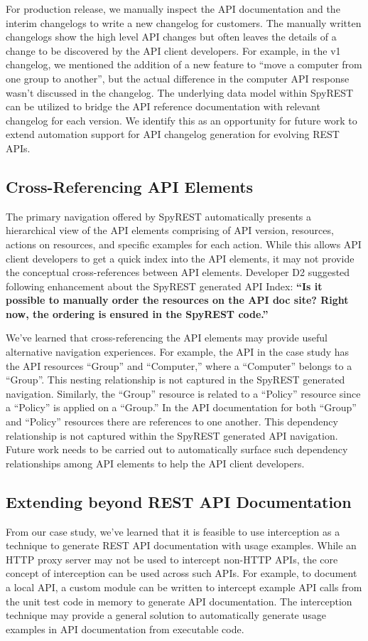 \documentclass[10pt, conference]{IEEEtran}
\begin{document}
For production release, we manually inspect the API documentation and the interim changelogs to write a new changelog for customers. The manually written changelogs show the high level API changes but often leaves the details of a change to be discovered by the API client developers. For example, in the v1 changelog, we mentioned the addition of a new feature to ``move a computer from one group to another'', but the actual difference in the computer API response wasn't discussed in the changelog. The underlying data model within SpyREST can be utilized to bridge the API reference documentation with relevant changelog for each version. We identify this as an opportunity for future work to extend automation support for API changelog generation for evolving REST APIs.

\subsection{Cross-Referencing API Elements}
The primary navigation offered by SpyREST automatically presents a hierarchical view of the API elements comprising of API version, resources, actions on resources, and specific examples for each action. While this allows API client developers to get a quick index into the API elements, it may not provide the conceptual cross-references between API elements. Developer D2 suggested following enhancement about the SpyREST generated API Index: \textbf{``Is it possible to manually order the resources on the API doc site? Right now, the ordering is ensured in the SpyREST code.''}

We've learned that cross-referencing the API elements may provide useful alternative navigation experiences. For example, the API in the case study has the API resources ``Group'' and ``Computer,'' where a ``Computer'' belongs to a ``Group''. This nesting relationship is not captured in the SpyREST generated navigation. Similarly, the ``Group'' resource is related to a ``Policy'' resource since a ``Policy'' is applied on a ``Group.'' In the API documentation for both ``Group'' and ``Policy'' resources there are references to one another. This dependency relationship is not captured within the SpyREST generated API navigation. Future work needs to be carried out to automatically surface such dependency relationships among API elements to help the API client developers.


\subsection{Extending beyond REST API Documentation}
From our case study, we've learned that it is feasible to use interception as a technique to generate REST API documentation with usage examples. While an HTTP proxy server may not be used to intercept non-HTTP APIs, the core concept of interception can be used across such APIs. For example, to document a local API, a custom module can be written to intercept example API calls from the unit test code in memory to generate API documentation. The interception technique may provide a general solution to automatically generate usage examples in API documentation from executable code.
\end{document}
